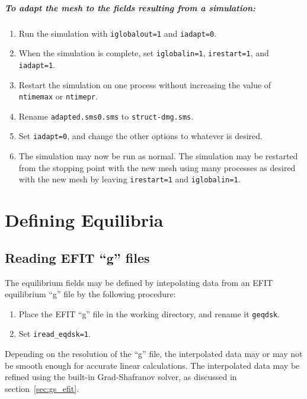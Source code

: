 \documentclass[letterpaper]{book}
\begin{document}
\paragraph{To adapt the mesh to the fields resulting from a simulation:}
\begin{enumerate}
\item Run the simulation with \texttt{iglobalout=1} and
  \texttt{iadapt=0}.
\item When the simulation is complete, set \texttt{iglobalin=1},
  \texttt{irestart=1}, and \texttt{iadapt=1}.
\item Restart the simulation on one process without increasing the
  value of \texttt{ntimemax} or \texttt{ntimepr}.
\item Rename \texttt{adapted.sms0.sms} to \texttt{struct-dmg.sms}.
\item Set \texttt{iadapt=0}, and change the other
  options to whatever is desired.
\item The simulation may now be run as normal.  The simulation may be
  restarted from the stopping point with the new mesh using many
  processes as desired with the new mesh by leaving
  \texttt{irestart=1} and \texttt{iglobalin=1}.
\end{enumerate}

\chapter{Defining Equilibria}

\section{Reading EFIT ``g'' files}

The equilibrium fields may be defined by intepolating data from an
EFIT equilibrium ``g'' file by the following procedure:

\begin{enumerate}
\item Place the EFIT ``g'' file in the working directory, and rename
  it \texttt{geqdsk}.
\item Set \texttt{iread\_eqdsk=1}.
\end{enumerate}

Depending on the resolution of the ``g'' file, the interpolated data
may or may not be smooth enough for accurate linear calculations.  The
interpolated data may be refined using the built-in Grad-Shafranov
solver, as discussed in section~\ref{sec:gs_efit}.
\end{document}
